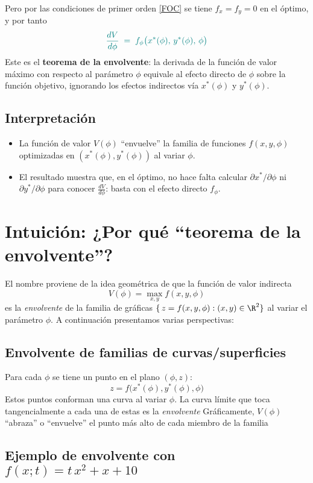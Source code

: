\documentclass{article}
\begin{document}
Pero por las condiciones de primer orden \eqref{FOC} se tiene \(f_x=f_y=0\) en el óptimo, y por tanto
\[
\color{teal}
\frac{dV}{d\phi} \;=\; f_\phi\bigl(x^*(\phi),\,y^*(\phi),\,\phi\bigr)
\]
{\color{teal}Este es el \textbf{teorema de la envolvente}: la derivada de la función de valor máximo con respecto al parámetro \(\phi\) equivale al efecto directo de \(\phi\) sobre la función objetivo, ignorando los efectos indirectos vía \(x^*(\phi)\) y \(y^*(\phi)\).}

\subsection*{Interpretación}

\begin{itemize}
  \item La función de valor \(V(\phi)\) “envuelve” la familia de funciones \(f(x,y,\phi)\) optimizadas en \((x^*(\phi),y^*(\phi))\) al variar \(\phi\).
  \item El resultado muestra que, en el óptimo, no hace falta calcular \(\partial x^*/\partial\phi\) ni \(\partial y^*/\partial\phi\) para conocer \(\tfrac{dV}{d\phi}\): basta con el efecto directo \(f_\phi\).
\end{itemize}

\section*{Intuición: ¿Por qué ``teorema de la envolvente''?}

El nombre proviene de la idea geométrica de que la función de valor indirecta
\[
V(\phi)=\max_{x,y}f(x,y,\phi)
\]
es la \emph{envolvente} de la familia de gráficas
\(\{\,z=f(x,y,\phi):(x,y)\in\R^2\}\) al variar el parámetro \(\phi\). A continuación presentamos varias perspectivas:

\subsection*{Envolvente de familias de curvas/superficies}

Para cada \(\phi\) se tiene un punto en el plano \((\phi,z)\):
\[
z = f\bigl(x^*(\phi),y^*(\phi),\phi\bigr)
\]
Estos puntos conforman una curva al variar $\phi$. La curva límite que toca tangencialmente a cada una de estas es la \emph{envolvente}  
Gráficamente, \(V(\phi)\) “abraza” o “envuelve” el punto más alto de cada miembro de la familia


\subsection*{Ejemplo de envolvente con \(f(x;t)=t\,x^2 + x + 10\)}
\end{document}
